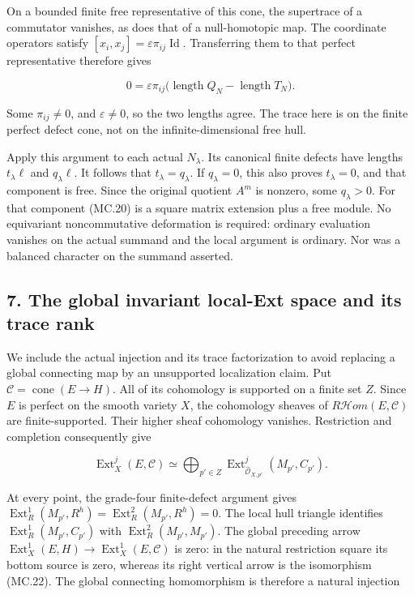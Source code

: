 On a bounded finite free representative of this cone, the supertrace
of a commutator vanishes, as does that of a null-homotopic map. The
coordinate operators satisfy
\([x_i,x_j]=\varepsilon\pi_{ij}\operatorname{Id}\). Transferring
them to that perfect representative therefore gives

\[
 0=\varepsilon\pi_{ij}
             \bigl(\operatorname{length}Q_N
                         -\operatorname{length}T_N\bigr).
 \tag{MC.21}
\]

Some \(\pi_{ij}\ne0\), and \(\varepsilon\ne0\), so the two
lengths agree. The trace here is on the finite perfect defect cone,
not on the infinite-dimensional free hull.

Apply this argument to each actual \(N_\lambda\). Its canonical
finite defects have lengths \(t_\lambda\ell\) and
\(q_\lambda\ell\). It follows that
\(t_\lambda=q_\lambda\). If \(q_\lambda=0\), this also proves
\(t_\lambda=0\), and that component is free. Since the original
quotient \(A^m\) is nonzero, some \(q_\lambda>0\). For that
component (MC.20) is a square matrix extension plus a free module.
No equivariant noncommutative deformation is required: ordinary
evaluation vanishes on the actual summand and the local argument is
ordinary. Nor was a balanced character on the summand asserted.

\subsection{7. The global invariant local-Ext space and its trace rank}\label{SF-E848:s7}

We include the actual injection and its trace factorization to avoid
replacing a global connecting map by an unsupported localization
claim. Put \(\mathcal C=\operatorname{cone}(E\to H)\). All of its
cohomology is supported on a finite set \(Z\). Since \(E\) is perfect
on the smooth variety \(X\), the cohomology sheaves of
\(R\mathcal Hom(E,\mathcal C)\) are finite-supported. Their higher
sheaf cohomology vanishes. Restriction and completion consequently give

\[
 \operatorname{Ext}^j_X(E,\mathcal C)
   \simeq\bigoplus_{p'\in Z}
       \operatorname{Ext}^j_{\widehat{\mathcal O}_{X,p'}}(M_{p'},C_{p'}).
 \tag{MC.22}
\]

At every point, the grade-four finite-defect argument gives
\(\operatorname{Ext}^1_R(M_{p'},R^{h})
 =\operatorname{Ext}^2_R(M_{p'},R^{h})=0\). The local hull triangle
identifies \(\operatorname{Ext}^1_R(M_{p'},C_{p'})\) with
\(\operatorname{Ext}^2_R(M_{p'},M_{p'})\). The global preceding
arrow \(\operatorname{Ext}^1_X(E,H)\to
\operatorname{Ext}^1_X(E,\mathcal C)\) is zero: in the natural
restriction square its bottom source is zero, whereas its right
vertical arrow is the isomorphism (MC.22). The global connecting
homomorphism is therefore a natural injection

